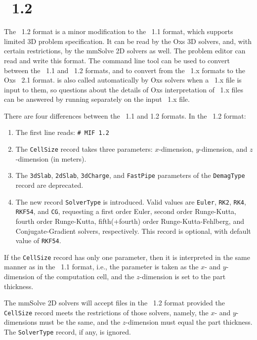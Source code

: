 \section{\MIF\ 1.2}\label{sec:mif12format}
The \MIF~1.2 format is a minor modification to the \MIF~1.1 format,
which supports limited 3D problem specification.  It can be read by the
Oxs 3D solvers, and, with certain restrictions, by the mmSolve 2D
solvers as well.  The  problem editor can read and
write this format.  The
 command line tool can be used to convert
between the \MIF~1.1 and \MIF~1.2 formats, and to convert from the
\MIF~1.x formats to the Oxs \MIF~2.1 format.   is also
called automatically by Oxs solvers when a \MIF~1.x file is input to
them, so questions about the details of Oxs interpretation of \MIF~1.x
files can be answered by running  separately on the
input \MIF~1.x file.

There are four differences between the \MIF~1.1 and 1.2 formats.  In
the \MIF~1.2 format:
\begin{enumerate}
\item The first line reads: \verb+# MIF 1.2+
\item The \texttt{CellSize} record takes three parameters:
      $x$-dimension, $y$-dimension, and $z$-dimension (in meters).
\item The \texttt{3dSlab}, \texttt{2dSlab}, \texttt{3dCharge}, and
      \texttt{FastPipe} parameters of the \texttt{DemagType} record
      are deprecated.
\item The new record \texttt{SolverType} is introduced.  Valid values
      are \texttt{Euler}, \texttt{RK2}, \texttt{RK4}, \texttt{RKF54},
      and \texttt{CG}, requesting a first order Euler, second order
      Runge-Kutta, fourth order Runge-Kutta, fifth(+fourth) order
      Runge-Kutta-Fehlberg, and Conjugate-Gradient solvers,
      respectively.  This record is optional, with default value of
      \texttt{RKF54}.
\end{enumerate}
If the \texttt{CellSize} record has only one parameter, then it is
interpreted in the same manner as in the \MIF~1.1 format, i.e., the
parameter is taken as the $x$- and $y$-dimension of the computation
cell, and the $z$-dimension is set to the part thickness.

The mmSolve 2D solvers will accept files in the \MIF~1.2 format provided
the \texttt{CellSize} record meets the restrictions of those solvers,
namely, the $x$- and $y$-dimensions must be the same, and the
$z$-dimension must equal the part thickness.  The \texttt{SolverType}
record, if any, is ignored.

